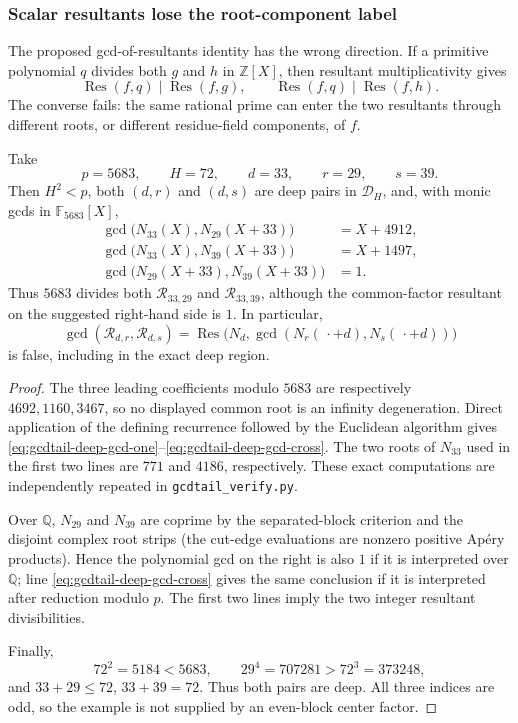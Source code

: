\subsubsection{Scalar resultants lose the root-component label}

The proposed gcd-of-resultants identity has the wrong direction.  If a
primitive polynomial $q$ divides both $g$ and $h$ in $\mathbb Z[X]$, then
resultant multiplicativity gives
\[
 \operatorname {Res}(f,q)\mid\operatorname {Res}(f,g),\qquad
 \operatorname {Res}(f,q)\mid\operatorname {Res}(f,h).
\]
The converse fails: the same rational prime can enter the two resultants
through different roots, or different residue-field components, of $f$.

\begin{proposition}
\label{prop:gcdtail-resultant-counterexample}
Take
\[
 p=5683,\qquad H=72,\qquad d=33,\qquad r=29,\qquad s=39.
\]
Then $H^2<p$, both $(d,r)$ and $(d,s)$ are deep pairs in
$\mathscr D_H$, and, with monic gcds in $\mathbb F_{5683}[X]$,
\begin{align}
 \gcd\bigl(N_{33}(X),N_{29}(X+33)\bigr)&=X+4912,
 \label{eq:gcdtail-deep-gcd-one}\\
 \gcd\bigl(N_{33}(X),N_{39}(X+33)\bigr)&=X+1497,
 \label{eq:gcdtail-deep-gcd-two}\\
 \gcd\bigl(N_{29}(X+33),N_{39}(X+33)\bigr)&=1.
 \label{eq:gcdtail-deep-gcd-cross}
\end{align}
Thus $5683$ divides both $\mathcal R_{33,29}$ and
$\mathcal R_{33,39}$, although the common-factor resultant on the
suggested right-hand side is $1$.  In particular,
\[
 \gcd(\mathcal R_{d,r},\mathcal R_{d,s})
 =\operatorname {Res}\bigl(N_d,
       \gcd(N_r(\,\cdot+d),N_s(\,\cdot+d))\bigr)
\]
is false, including in the exact deep region.
\end{proposition}

\begin{proof}
The three leading coefficients modulo $5683$ are respectively
$4692,1160,3467$, so no displayed common root is an infinity
degeneration.  Direct application of the defining recurrence followed by
the Euclidean algorithm gives
\eqref{eq:gcdtail-deep-gcd-one}--\eqref{eq:gcdtail-deep-gcd-cross}.
The two roots of $N_{33}$ used in the first two lines are $771$ and
$4186$, respectively.  These exact computations are independently
repeated in \texttt{gcdtail\_verify.py}.

Over $\mathbb Q$, $N_{29}$ and $N_{39}$ are coprime by the separated-block
criterion and the disjoint complex root strips (the cut-edge evaluations
are nonzero positive Ap\'ery products).  Hence the polynomial gcd on the
right is also $1$ if it is interpreted over $\mathbb Q$; line
\eqref{eq:gcdtail-deep-gcd-cross} gives the same conclusion if it is
interpreted after reduction modulo $p$.  The first two lines imply the two
integer resultant divisibilities.

Finally,
\[
 72^2=5184<5683,\qquad 29^4=707281>72^3=373248,
\]
and $33+29\leq72$, $33+39=72$.  Thus both pairs are deep.  All three
indices are odd, so the example is not supplied by an even-block center
factor.
\end{proof}

